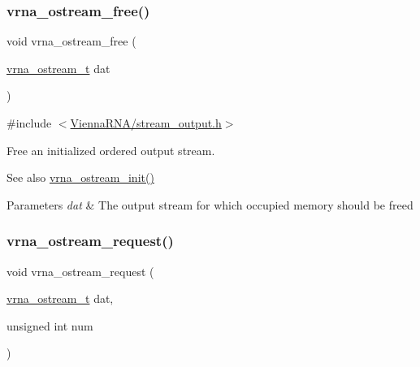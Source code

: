 \subsubsection{\texorpdfstring{vrna\+\_\+ostream\+\_\+free()}{vrna\_ostream\_free()}}
{\footnotesize\ttfamily void vrna\+\_\+ostream\+\_\+free (\begin{DoxyParamCaption}\item[{\hyperlink{group__buffer__utils_ga8da189552af21ab6e4e88bdcc240870c}{vrna\+\_\+ostream\+\_\+t}}]{dat }\end{DoxyParamCaption})}



{\ttfamily \#include $<$\hyperlink{stream__output_8h}{Vienna\+R\+N\+A/stream\+\_\+output.\+h}$>$}



Free an initialized ordered output stream. 

\begin{DoxySeeAlso}{See also}
\hyperlink{group__buffer__utils_gad23113e66a0910ec2341856e2da56bf6}{vrna\+\_\+ostream\+\_\+init()}
\end{DoxySeeAlso}

\begin{DoxyParams}{Parameters}
{\em dat} & The output stream for which occupied memory should be free\textquotesingle{}d \\
\hline
\end{DoxyParams}
\mbox{\label{group__buffer__utils_gaebca91932705d71bcbf00bd8d82bd7c8}} 
\subsubsection{\texorpdfstring{vrna\+\_\+ostream\+\_\+request()}{vrna\_ostream\_request()}}
{\footnotesize\ttfamily void vrna\+\_\+ostream\+\_\+request (\begin{DoxyParamCaption}\item[{\hyperlink{group__buffer__utils_ga8da189552af21ab6e4e88bdcc240870c}{vrna\+\_\+ostream\+\_\+t}}]{dat,  }\item[{unsigned int}]{num }\end{DoxyParamCaption})}



